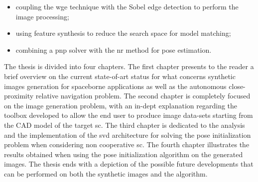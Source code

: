 \begin{itemize}
  \item coupling the \acrfull{wge} technique with the Sobel edge detection to perform the image processing;
  \item using feature synthesis to reduce the search space for model matching;
  \item combining a \acrshort{pnp} solver with the \acrfull{nr} method for pose estimation.
\end{itemize}

The thesis is divided into four chapters. The first chapter presents to the reader a brief overview on the current state-of-art status for what concerns synthetic images generation for spaceborne applications as well as the autonomous close-proximity relative navigation problem. The second chapter is completely focused on the image generation problem, with an in-dept explanation regarding the toolbox developed to allow the end user to produce image data-sets starting from the CAD model of the target \acrshort{sc}. The third chapter is dedicated to the analysis and the implementation of the \acrshort{svd} architecture for solving the pose initialization problem when considering non cooperative \acrshort{sc}. The fourth chapter illustrates the results obtained when using the pose initialization algorithm on the generated images. The thesis ends with a depiction of the possible future developments that can be performed on both the synthetic images and the algorithm.